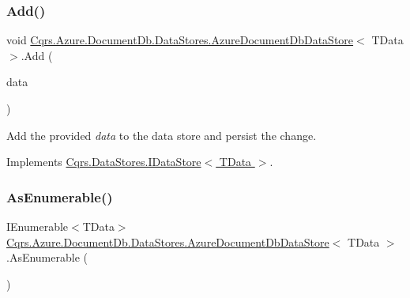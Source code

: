 \subsubsection{\texorpdfstring{Add()}{Add()}\hspace{0.1cm}{\footnotesize\ttfamily [2/2]}}
{\footnotesize\ttfamily void \hyperlink{classCqrs_1_1Azure_1_1DocumentDb_1_1DataStores_1_1AzureDocumentDbDataStore}{Cqrs.\+Azure.\+Document\+Db.\+Data\+Stores.\+Azure\+Document\+Db\+Data\+Store}$<$ T\+Data $>$.Add (\begin{DoxyParamCaption}\item[{I\+Enumerable$<$ T\+Data $>$}]{data }\end{DoxyParamCaption})}



Add the provided {\itshape data}  to the data store and persist the change. 



Implements \hyperlink{interfaceCqrs_1_1DataStores_1_1IDataStore_a906f3f2f80db7a549a4170eca4653e26_a906f3f2f80db7a549a4170eca4653e26}{Cqrs.\+Data\+Stores.\+I\+Data\+Store$<$ T\+Data $>$}.

\mbox{\label{classCqrs_1_1Azure_1_1DocumentDb_1_1DataStores_1_1AzureDocumentDbDataStore_acbe24a7d0def44ca4826bbf5658a6054_acbe24a7d0def44ca4826bbf5658a6054}} 
\subsubsection{\texorpdfstring{As\+Enumerable()}{AsEnumerable()}}
{\footnotesize\ttfamily I\+Enumerable$<$T\+Data$>$ \hyperlink{classCqrs_1_1Azure_1_1DocumentDb_1_1DataStores_1_1AzureDocumentDbDataStore}{Cqrs.\+Azure.\+Document\+Db.\+Data\+Stores.\+Azure\+Document\+Db\+Data\+Store}$<$ T\+Data $>$.As\+Enumerable (\begin{DoxyParamCaption}{ }\end{DoxyParamCaption})}




